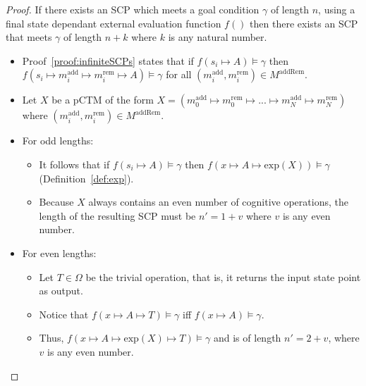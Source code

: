 \begin{proof} \label{proof:infiniteSCPLength}
If there exists an SCP which meets a goal condition $\gamma$ of length $n$, using a final state dependant external evaluation function $f()$ then there exists an SCP that meets $\gamma$ of length $n+k$ where $k$ is any natural number.
\begin{itemize}

\item Proof~\ref{proof:infiniteSCPs} states that if $f(s_i \longmapsto A)\models \gamma$ then $f(s_i \longmapsto m^\text{add}_i \longmapsto m^\text{rem}_i \longmapsto A) \models \gamma$ for all $(m^\text{add}_i, m^\text{rem}_i) \in M^\text{addRem}$.
\item Let $X$ be a pCTM of the form $X=(m^\text{add}_0 \longmapsto m^\text{rem}_0 \longmapsto ... \longmapsto m^\text{add}_N \longmapsto m^\text{rem}_{N})$ where $(m^\text{add}_i, m^\text{rem}_i) \in M^\text{addRem}$.
\item For odd lengths:
\begin{itemize}
\item  It follows that if $f(s_i \longmapsto A)\models \gamma$ then $f(x \longmapsto A \longmapsto \textrm{exp}(X))\models \gamma$ (Definition~\ref{def:exp}).
\item Because $X$ always contains an even number of cognitive operations, the length of the resulting SCP must be $n' = 1+v$ where $v$ is any even number.
\end{itemize}
\item For even lengths:
\begin{itemize}
\item Let $T \in \Omega$ be the trivial operation, that is, it returns the input state point as output.
\item Notice that $f(x \longmapsto A \longmapsto T) \models \gamma$ iff $f(x \longmapsto A) \models \gamma$.
\item Thus, $f(x \longmapsto A \longmapsto \textrm{exp}(X) \longmapsto T )\models \gamma$ and is of length $n' = 2+v$, where $v$ is any even number.
\end{itemize}
\end{itemize}

\end{proof}

